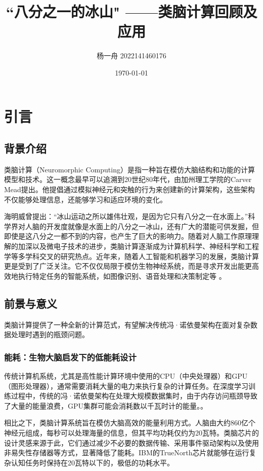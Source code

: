 \documentclass[a4paper,12pt]{article}
\title{“八分之一的冰山"
——类脑计算回顾及应用}
\author{杨一舟 2022141460176}
\date{\today}
\begin{document}
\maketitle

\section{引言}

\subsection{背景介绍}

类脑计算（Neuromorphic Computing）是指一种旨在模仿大脑结构和功能的计算模型和技术。这一概念最早可以追溯到20世纪80年代，由加州理工学院的Carver Mead提出。他提倡通过模拟神经元和突触的行为来创建新的计算架构，这些架构不仅能够处理信息，还能够学习和适应环境的变化。

海明威曾提出：“冰山运动之所以雄伟壮观，是因为它只有八分之一在水面上。”科学界对人脑的开发度就像是水面上的八分之一冰山，还有广大的潜能可供发掘，但即使是这八分之一都不到的内容，也产生了巨大的影响力。随着对人脑工作原理理解的加深以及微电子技术的进步，类脑计算逐渐成为计算机科学、神经科学和工程学等多学科交叉的研究热点。近年来，随着人工智能和机器学习的发展，类脑计算更是受到了广泛关注。它不仅仅局限于模仿生物神经系统\cite{indiveri2011neuromorphic}，而是寻求开发出能更高效地执行特定任务的智能系统，如图像识别、语音处理和决策制定等 \cite{sze2017efficient}。

\subsection{前景与意义}
类脑计算提供了一种全新的计算范式，有望解决传统冯·诺依曼架构在面对复杂数据处理时遇到的瓶颈问题。

\subsubsection{能耗：生物大脑启发下的低能耗设计}

传统计算机系统，尤其是高性能计算环境中使用的CPU（中央处理器）和GPU（图形处理器），通常需要消耗大量的电力来执行复杂的计算任务。在深度学习训练过程中，传统的冯·诺依曼架构在处理大规模数据集时，由于内存访问瓶颈导致了大量的能量浪费，GPU集群可能会消耗数以千瓦时计的能量。\cite{sze2017efficient}。

相比之下，类脑计算系统旨在模仿大脑高效的能量利用方式。人脑由大约860亿个神经元组成，每秒可以处理海量的信息，但其平均功耗仅约为20瓦特\cite{herculano2009human}。类脑芯片的设计灵感来源于此，它们通过减少不必要的数据传输、采用事件驱动架构以及使用非易失性存储器等方式，显著降低了能耗。IBM的TrueNorth芯片就能够在运行复杂认知任务时保持在20瓦特以下的，极低的功耗水平\cite{merolla2014million}。
\end{document}
